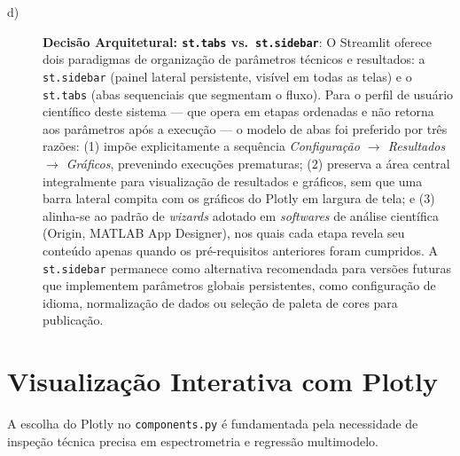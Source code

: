 \begin{description}
\item[d)] \textbf{Decisão Arquitetural: \texttt{st.tabs} vs.\ \texttt{st.sidebar}}: O
Streamlit oferece dois paradigmas de organização de parâmetros técnicos e resultados:
a \texttt{st.sidebar} (painel lateral persistente, visível em todas as telas) e o
\texttt{st.tabs} (abas sequenciais que segmentam o fluxo). Para o perfil de usuário
científico deste sistema — que opera em etapas ordenadas e não retorna aos parâmetros
após a execução — o modelo de abas foi preferido por três razões: (1) impõe
explicitamente a sequência \textit{Configuração $\rightarrow$ Resultados $\rightarrow$
Gráficos}, prevenindo execuções prematuras; (2) preserva a área central integralmente
para visualização de resultados e gráficos, sem que uma barra lateral compita com os
gráficos do Plotly em largura de tela; e (3) alinha-se ao padrão de \textit{wizards}
adotado em \textit{softwares} de análise científica (Origin, MATLAB App Designer), nos
quais cada etapa revela seu conteúdo apenas quando os pré-requisitos anteriores foram
cumpridos. A \texttt{st.sidebar} permanece como alternativa recomendada para versões
futuras que implementem parâmetros globais persistentes, como configuração de idioma,
normalização de dados ou seleção de paleta de cores para publicação.

\end{description}

\section{Visualização Interativa com Plotly}

A escolha do Plotly no \texttt{components.py} é fundamentada pela necessidade de
inspeção técnica precisa em espectrometria e regressão multimodelo.

